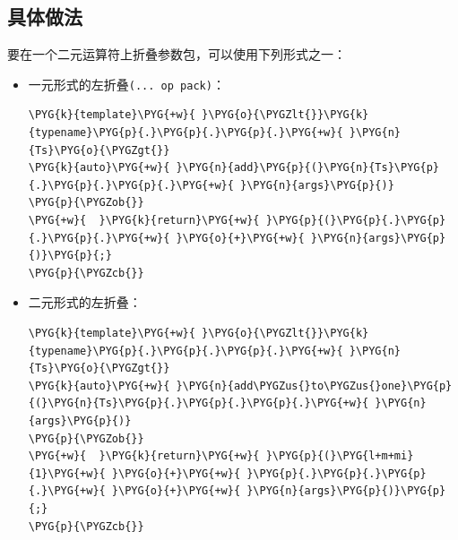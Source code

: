 
\subsection{具体做法}



要在一个二元运算符上折叠参数包，可以使用下列形式之一：



\begin{itemize}
\item 一元形式的左折叠\texttt{(... op pack)}：



\begin{codeblockbg}
\begin{Verbatim}[commandchars=\\\{\},breaklines=true,breakanywhere=true,fontsize=\codefont,xleftmargin=17bp]
\PYG{k}{template}\PYG{+w}{ }\PYG{o}{\PYGZlt{}}\PYG{k}{typename}\PYG{p}{.}\PYG{p}{.}\PYG{p}{.}\PYG{+w}{ }\PYG{n}{Ts}\PYG{o}{\PYGZgt{}}
\PYG{k}{auto}\PYG{+w}{ }\PYG{n}{add}\PYG{p}{(}\PYG{n}{Ts}\PYG{p}{.}\PYG{p}{.}\PYG{p}{.}\PYG{+w}{ }\PYG{n}{args}\PYG{p}{)}
\PYG{p}{\PYGZob{}}
\PYG{+w}{  }\PYG{k}{return}\PYG{+w}{ }\PYG{p}{(}\PYG{p}{.}\PYG{p}{.}\PYG{p}{.}\PYG{+w}{ }\PYG{o}{+}\PYG{+w}{ }\PYG{n}{args}\PYG{p}{)}\PYG{p}{;}
\PYG{p}{\PYGZcb{}}
\end{Verbatim}
\end{codeblockbg}



\item 二元形式的左折叠：



\begin{codeblockbg}
\begin{Verbatim}[commandchars=\\\{\},breaklines=true,breakanywhere=true,fontsize=\codefont,xleftmargin=17bp]
\PYG{k}{template}\PYG{+w}{ }\PYG{o}{\PYGZlt{}}\PYG{k}{typename}\PYG{p}{.}\PYG{p}{.}\PYG{p}{.}\PYG{+w}{ }\PYG{n}{Ts}\PYG{o}{\PYGZgt{}}
\PYG{k}{auto}\PYG{+w}{ }\PYG{n}{add\PYGZus{}to\PYGZus{}one}\PYG{p}{(}\PYG{n}{Ts}\PYG{p}{.}\PYG{p}{.}\PYG{p}{.}\PYG{+w}{ }\PYG{n}{args}\PYG{p}{)}
\PYG{p}{\PYGZob{}}
\PYG{+w}{  }\PYG{k}{return}\PYG{+w}{ }\PYG{p}{(}\PYG{l+m+mi}{1}\PYG{+w}{ }\PYG{o}{+}\PYG{+w}{ }\PYG{p}{.}\PYG{p}{.}\PYG{p}{.}\PYG{+w}{ }\PYG{o}{+}\PYG{+w}{ }\PYG{n}{args}\PYG{p}{)}\PYG{p}{;}
\PYG{p}{\PYGZcb{}}
\end{Verbatim}
\end{codeblockbg}



\end{itemize}
